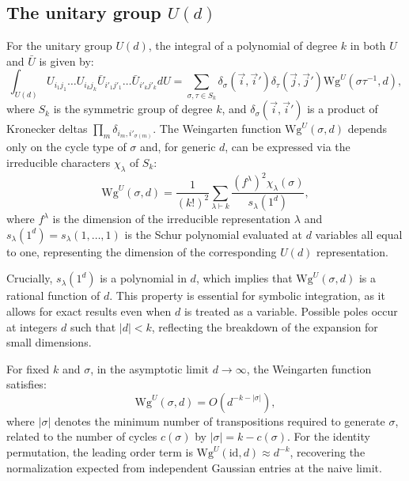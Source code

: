 \documentclass[manuscript,screen]{acmart}
\begin{document}
\subsection{The unitary group $U(d)$}
For the unitary group $U(d)$, the integral of a polynomial of degree $k$ in both
$U$ and $\bar{U}$ is given by:
\begin{equation}
\int_{U(d)} U_{i_1 j_1} \dots U_{i_k j_k} \bar{U}_{i'_1 j'_1} \dots \bar{U}_{i'_k j'_k} dU = \sum_{\sigma, \tau \in S_k} \delta_\sigma(\vec{i}, \vec{i}') \delta_\tau(\vec{j}, \vec{j}') \mathrm{Wg}^U(\sigma\tau^{-1}, d),
\end{equation}
where $S_k$ is the symmetric group of degree $k$, and $\delta_\sigma(\vec{i},
\vec{i}')$ is a product of Kronecker deltas $\prod_m \delta_{i_m,
i'_{\sigma(m)}}$. The Weingarten function $\mathrm{Wg}^U(\sigma, d)$ depends
only on the cycle type of $\sigma$ and, for generic $d$, can be expressed via
the irreducible characters $\chi_\lambda$ of $S_k$:
\begin{equation}
\mathrm{Wg}^U(\sigma, d) = \frac{1}{(k!)^2} \sum_{\lambda \vdash k} \frac{(f^\lambda)^2 \chi_\lambda(\sigma)}{s_\lambda(1^d)},
\end{equation}
where $f^\lambda$ is the dimension of the irreducible representation $\lambda$
and $s_\lambda(1^d) = s_\lambda(1,\ldots,1)$ is the Schur polynomial evaluated
at $d$ variables all equal to one, representing the dimension of the
corresponding $U(d)$ representation.

Crucially, $s_\lambda(1^d)$ is a polynomial in $d$, which implies that
$\mathrm{Wg}^U(\sigma, d)$ is a rational function of $d$. This property is
essential for symbolic integration, as it allows for exact results even when $d$
is treated as a variable. Possible poles occur at integers $d$ such that
$|d| < k$, reflecting the breakdown of the expansion for small dimensions.

For fixed $k$ and $\sigma$, in the asymptotic limit $d \to \infty$, the
Weingarten function satisfies:
\begin{equation}
\mathrm{Wg}^U(\sigma, d) = O(d^{-k - |\sigma|}),
\end{equation}
where $|\sigma|$ denotes the minimum number of transpositions required to
generate $\sigma$, related to the number of cycles $c(\sigma)$ by $|\sigma| =
k - c(\sigma)$. For the identity permutation, the leading order term is
$\mathrm{Wg}^U(\mathrm{id}, d) \approx d^{-k}$, recovering the normalization
expected from independent Gaussian entries at the naive limit.
\end{document}
